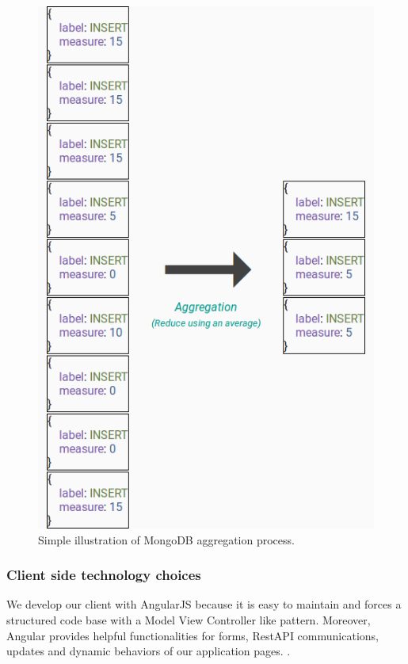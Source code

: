 \documentclass[a4paper,11pt]{report}
\begin{document}
\begin{figure}[ht]
\begin{center}
\includegraphics[scale=0.35]{images/mongodb-agg.png}
\caption{Simple illustration of MongoDB aggregation process.}
\label{mongo_agg}
\end{center}
\end{figure}

\clearpage

\subsubsection{Client side technology choices}

We develop our client with AngularJS because it is easy to maintain and forces a structured code base with a Model View Controller like pattern. Moreover, Angular provides helpful functionalities for forms, RestAPI communications, updates and dynamic behaviors of our application pages. \cite{angular:website}.
\end{document}
